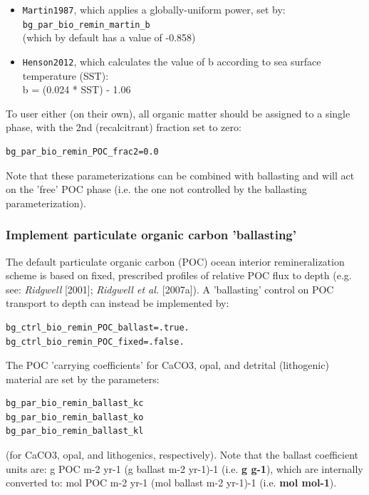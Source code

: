\documentclass[11pt,fleqn]{book} %
\begin{document}
\begin{itemize}[noitemsep]

\vspace{1mm}
\item \texttt{Martin1987}, which applies a globally-uniform power, set by:
  \\ \texttt{bg\_par\_bio\_remin\_martin\_b}
  \\(which by default has a value of -0.858)
  
\vspace{1mm}
\item \texttt{Henson2012}, which calculates the value of b according to sea surface temperature (SST):
  \\b = (0.024 * SST) - 1.06
  
\end{itemize}

To user either (on their own), all organic matter should be assigned to a single phase, with the 2nd (recalcitrant) fraction set to zero:
\vspace{-2pt}\begin{verbatim}
bg_par_bio_remin_POC_frac2=0.0
\end{verbatim}\vspace{-2pt}

Note that these parameterizations can be combined with ballasting and will act on the 'free' POC phase (i.e. the one not controlled by the ballasting parameterization).

%
\subsubsection{Implement particulate organic carbon 'ballasting'}
\vspace{1mm}

The default particulate organic carbon (POC) ocean interior remineralization scheme is based on fixed, prescribed profiles of relative POC flux to depth (e.g. see: \textit{Ridgwell} [2001]; \textit{Ridgwell et al.} [2007a]). A 'ballasting' control on POC transport to depth can instead be implemented by:
\vspace{-2pt}\begin{verbatim}
bg_ctrl_bio_remin_POC_ballast=.true.
bg_ctrl_bio_remin_POC_fixed=.false.
\end{verbatim}\vspace{-2pt}

The POC 'carrying coefficients' for CaCO3, opal, and detrital (lithogenic) material are set by the parameters:
\vspace{-2pt}\begin{verbatim}
bg_par_bio_remin_ballast_kc
bg_par_bio_remin_ballast_ko
bg_par_bio_remin_ballast_kl
\end{verbatim}\vspace{-2pt}
(for CaCO3, opal, and lithogenics, respectively). Note that the ballast coefficient units are: g POC m-2 yr-1 (g ballast m-2 yr-1)-1 (i.e. \textbf{g g-1}), which are internally converted to: mol POC m-2 yr-1 (mol ballast m-2 yr-1)-1 (i.e. \textbf{mol mol-1}).
\end{document}
